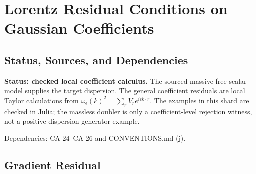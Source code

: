 
\section{Lorentz Residual Conditions on Gaussian Coefficients}
\label{sec:gaussian-boson-residual-conditions}

\subsection{Status, Sources, and Dependencies}

\textbf{Status: checked local coefficient calculus.}  The sourced massive free
scalar model supplies the target dispersion.  The general coefficient residuals are
local Taylor calculations from
\(\omega_\epsilon(k)^2=\sum_rV_re^{i\epsilon k\cdot r}\).  The examples in
this shard are checked in Julia; the massless doubler is only a coefficient-level
rejection witness, not a positive-dispersion generator example.

Dependencies: CA-24--CA-26 and CONVENTIONS.md (j).


\subsection{Gradient Residual}

